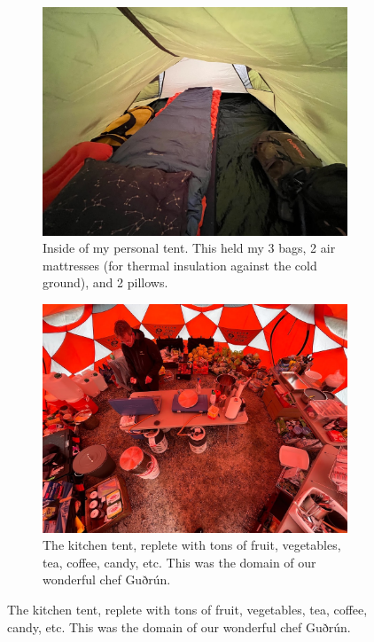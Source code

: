 \begin{figure}
	\centering
	\begin{subfigure}{0.49\textwidth}
	\includegraphics[width=\textwidth]{./images/personal_tent_inside.jpg}
		\caption{Inside of my personal tent. This held my 3 bags, 2 air mattresses
		(for thermal insulation against the cold ground), and 2 pillows.}
	\label{figure:personal_tent_inside}
	\end{subfigure}
	\centering
	\begin{subfigure}{0.49\textwidth}
	\includegraphics[width=\textwidth]{./images/kitchen_tent_inside.jpg}
	\caption{The kitchen tent, replete with tons of fruit, vegetables, tea, coffee, candy, etc. This was the domain of our wonderful chef Guðrún.}
	\label{figure:kitchen_tent}
	\end{subfigure}
\end{figure}

